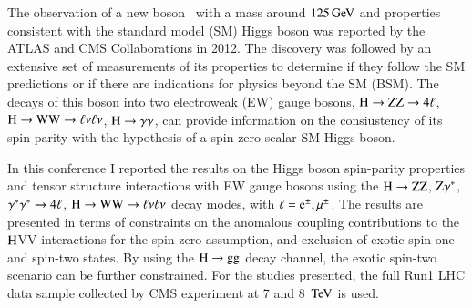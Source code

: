 The observation of a new boson~\cite{Aad:2012tfa,Chatrchyan:2012ufa}
with a mass around $125\,\mathrm{Ge\hspace{-.08em}V}$ and properties consistent with the
standard model (SM) Higgs boson was reported by the ATLAS and CMS
Collaborations in 2012. The discovery was followed by an extensive set
of measurements of its properties to determine if they follow the SM
predictions or if there are indications for physics beyond the SM
(BSM). The decays of this boson into two electroweak (EW) gauge
bosons, $\mathrm{H}\to\mathrm{Z}\mathrm{Z}\to4\ell$, $\mathrm{H}\to\mathrm{W}\mathrm{W}\to\ell\nu\ell\nu$, $\mathrm{H}\to\gamma\gamma$, can provide information on
the consiustency of its spin-parity with the hypothesis of a spin-zero
scalar SM Higgs boson.

In this conference I reported the results on the Higgs boson
spin-parity properties and tensor structure interactions with EW gauge
bosons using the $\mathrm{H}\to\mathrm{Z}\mathrm{Z}$, $\mathrm{Z}\gamma^*$, $\gamma^*\gamma^*\to4\ell$,
$\mathrm{H}\to\mathrm{W}\mathrm{W}\to\ell\nu\ell\nu$ decay modes, with $\ell=\mathrm{\mathrm{e}}^{\pm},\mu^{\pm}$. The results are
presented in terms of constraints on the anomalous coupling
contributions to the $\mathrm{H}$VV interactions for the spin-zero
assumption, and exclusion of exotic spin-one and spin-two states.  By
using the $\mathrm{H}\to\mathrm{g}\mathrm{g}$ decay channel, the exotic spin-two scenario
can be further constrained.  For the studies presented, the full Run1
LHC data sample collected by CMS experiment at 7 and 8 $\,\mathrm{Te\hspace{-.08em}V}$ is used.


